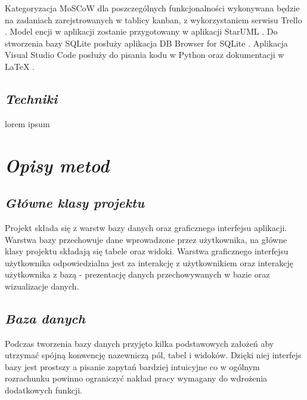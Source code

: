 \documentclass[a4paper,10pt]{report}
\newcommand{\customstylechapter}[1]{\large{\textit{#1}}}
\newcommand{\customstylesection}[1]{\textbf{\textit{#1}}}
\begin{document}
{Kategoryzacja MoSCoW dla poszczególnych funkcjonalności wykonywana będzie na 
zadaniach zarejstrowanych w tablicy kanban, z wykorzystaniem serwisu Trello 
\cite{Trello}. Model encji w aplikacji zostanie przygotowany w aplikacji StarUML
 \cite{StarUML}. Do stworzenia bazy SQLite \cite{SQLite} posłuży aplikacja 
DB Browser for SQLite \cite{DBBrowser}. Aplikacja Visual Studio Code 
\cite{VSCode} posłuży do pisania kodu w Python \cite{Python} oraz dokumentacji 
w LaTeX \cite{LaTeX}.}

\section{\customstylesection{Techniki}}
{lorem ipsum}

\chapter{\customstylechapter{Opisy metod}}
\section{\customstylesection{Główne klasy projektu}}
{Projekt składa się z warstw bazy danych oraz graficznego interfejsu aplikacji. 
Warstwa bazy przechowuje dane wprowadzone przez użytkownika, na główne klasy 
projektu składają się tabele oraz widoki. Warstwa graficznego interfejsu 
użytkownika odpowiedzialna jest za interakcję z użytkownikiem oraz interakcję
 użytkownika z bazą - prezentację danych przechowywanych w bazie oraz 
wizualizacje danych.}

\section{\customstylesection{Baza danych}}  \label{Baza-danych}

{Podczas tworzenia bazy danych przyjęto kilka podstawowych założeń aby utrzymać 
spójną konwencję nazewniczą pól, tabel i widoków. Dzięki niej interfejs bazy 
jest prostszy a pisanie zapytań bardziej intuicyjne co w ogólnym rozrachunku 
powinno ograniczyć nakład pracy wymagany do wdrożenia dodatkowych funkcji.}
\end{document}
